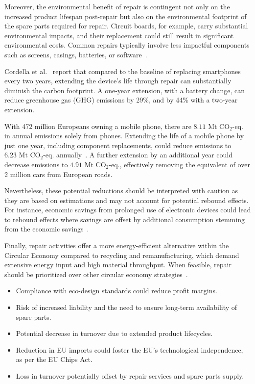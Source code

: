 Moreover, the environmental benefit of repair is contingent not only on the
increased product lifespan post-repair but also on the environmental footprint
of the spare parts required for repair. Circuit boards, for example, carry
substantial environmental impacts, and their replacement could still result in
significant environmental costs. Common repairs typically involve less
impactful components such as screens, casings, batteries, or
software~\cite{cordella2021repairlca}.

Cordella et al.~\cite{cordella2021repairlca} report that compared to the
baseline of replacing smartphones every two years,
extending the device's life through repair can substantially diminish the
carbon footprint. A one-year extension, with a battery change, can reduce
greenhouse gas (GHG) emissions by 29\%, and by 44\% with a two-year extension.

With 472 million Europeans owning a mobile phone, there are \(8.11 \text{ Mt
    CO}_2\text{-eq.}\) in annual emissions solely from phones. Extending the life
of a mobile phone by just one year, including component replacements, could
reduce emissions to \(6.23 \text{ Mt CO}_2\text{-eq.}\)
annually~\cite{moeslinger2022repair}. A further extension by an additional year
could decrease emissions to \(4.91 \text{ Mt CO}_2\text{-eq.}\), effectively
removing the equivalent of over 2 million cars from European roads.

Nevertheless, these potential reductions should be interpreted with caution as
they are based on estimations and may not account for potential rebound
effects. For instance, economic savings from prolonged use of electronic
devices could lead to rebound effects where savings are offset by additional
consumption stemming from the economic savings~\cite{makov2018sharing}.

Finally, repair activities offer a more energy-efficient alternative within the
Circular Economy compared to recycling and remanufacturing, which demand
extensive energy input and high material throughput. When feasible, repair
should be prioritized over other circular economy
strategies~\cite{eu2019repair}.

\begin{itemize}
    \item Compliance with eco-design standards could reduce profit margins.
    \item Risk of increased liability and the need to ensure long-term availability of
          spare parts.
    \item Potential decrease in turnover due to extended product lifecycles.
    \item Reduction in EU imports could foster the EU's technological independence, as per
          the EU Chips Act.
    \item Loss in turnover potentially offset by repair services and spare parts supply.
\end{itemize}

